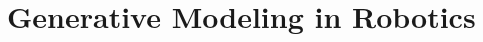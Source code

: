 

\pagestyle{fancy} 
\chapter{Generative Modeling in Robotics}
\label{cha:2}
\vspace{1cm}



\clearpage{\pagestyle{empty}\cleardoublepage}